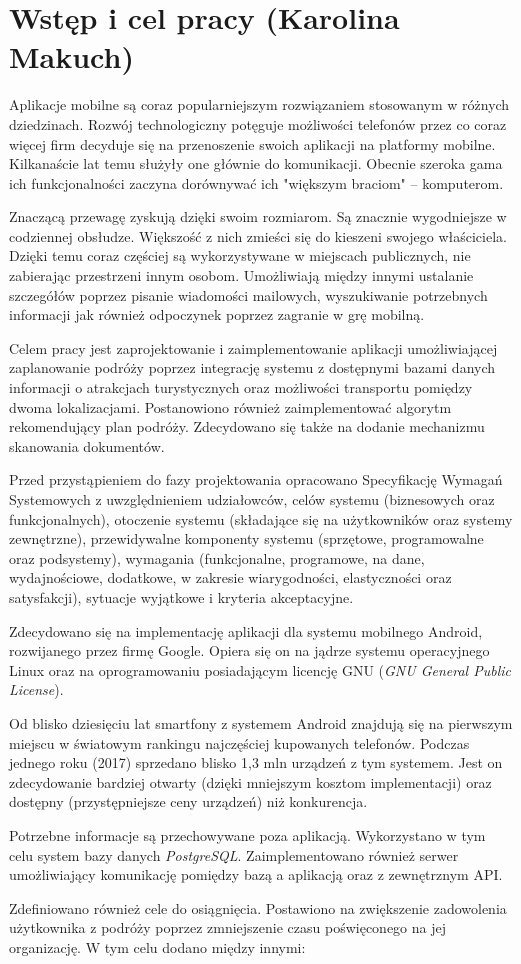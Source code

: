 \chapter{Wstęp i cel pracy (Karolina Makuch)}
\par Aplikacje mobilne są coraz popularniejszym rozwiązaniem stosowanym w różnych dziedzinach. Rozwój technologiczny potęguje możliwości telefonów przez co coraz więcej firm decyduje się na przenoszenie swoich aplikacji na platformy mobilne. Kilkanaście lat temu  służyły one głównie do komunikacji. Obecnie szeroka gama ich funkcjonalności zaczyna dorównywać ich "większym braciom" -- komputerom.
\par Znaczącą przewagę zyskują dzięki swoim rozmiarom. Są znacznie wygodniejsze w codziennej obsłudze. Większość z nich zmieści się do kieszeni swojego właściciela. Dzięki temu coraz częściej są wykorzystywane w miejscach publicznych, nie zabierając przestrzeni innym osobom. Umożliwiają między innymi ustalanie szczegółów poprzez pisanie wiadomości mailowych, wyszukiwanie potrzebnych informacji jak również odpoczynek poprzez zagranie w grę mobilną.
\par Celem pracy jest zaprojektowanie i zaimplementowanie aplikacji umożliwiającej zaplanowanie podróży poprzez integrację systemu z dostępnymi bazami danych informacji o atrakcjach turystycznych oraz możliwości transportu pomiędzy dwoma lokalizacjami. Postanowiono również zaimplementować algorytm rekomendujący plan podróży. Zdecydowano się także na dodanie mechanizmu skanowania dokumentów. 
\par Przed przystąpieniem do fazy projektowania opracowano Specyfikację Wymagań Systemowych z uwzględnieniem udziałowców, celów systemu (biznesowych oraz funkcjonalnych), otoczenie systemu (składające się na użytkowników oraz systemy zewnętrzne), przewidywalne komponenty systemu (sprzętowe, programowalne oraz podsystemy), wymagania (funkcjonalne, programowe, na dane, wydajnościowe, dodatkowe, w zakresie wiarygodności, elastyczności oraz satysfakcji), sytuacje wyjątkowe i kryteria akceptacyjne.
\par Zdecydowano się na implementację aplikacji dla systemu mobilnego Android, rozwijanego przez firmę Google. Opiera się on na jądrze systemu operacyjnego Linux oraz na oprogramowaniu posiadającym licencję GNU (\textit{GNU General Public License}).
 \par Od blisko dziesięciu lat smartfony z systemem Android znajdują się na pierwszym miejscu w światowym rankingu najczęściej kupowanych telefonów. Podczas jednego roku (2017) sprzedano blisko 1,3 mln urządzeń z tym systemem. Jest on zdecydowanie bardziej otwarty (dzięki mniejszym kosztom implementacji) oraz dostępny (przystępniejsze ceny urządzeń) niż konkurencja.
\par Potrzebne informacje są przechowywane poza aplikacją. Wykorzystano w tym celu system bazy danych \textit{PostgreSQL}. Zaimplementowano również serwer umożliwiający komunikację pomiędzy bazą a aplikacją oraz z zewnętrznym API.
\par Zdefiniowano również cele do osiągnięcia. Postawiono na zwiększenie zadowolenia użytkownika z podróży poprzez zmniejszenie czasu poświęconego na jej organizację. W tym celu dodano między innymi:

